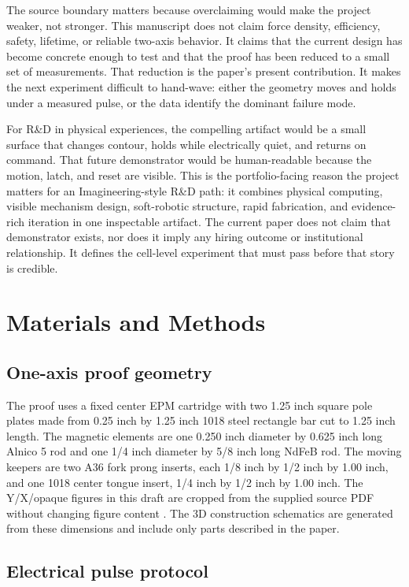 \documentclass[12pt,letterpaper]{article}
\begin{document}
The source boundary matters because overclaiming would make the project weaker, not stronger. This manuscript does not claim force density, efficiency, safety, lifetime, or reliable two-axis behavior. It claims that the current design has become concrete enough to test and that the proof has been reduced to a small set of measurements. That reduction is the paper's present contribution. It makes the next experiment difficult to hand-wave: either the geometry moves and holds under a measured pulse, or the data identify the dominant failure mode.

For R\&D in physical experiences, the compelling artifact would be a small surface that changes contour, holds while electrically quiet, and returns on command. That future demonstrator would be human-readable because the motion, latch, and reset are visible. This is the portfolio-facing reason the project matters for an Imagineering-style R\&D path: it combines physical computing, visible mechanism design, soft-robotic structure, rapid fabrication, and evidence-rich iteration in one inspectable artifact. The current paper does not claim that demonstrator exists, nor does it imply any hiring outcome or institutional relationship. It defines the cell-level experiment that must pass before that story is credible.

\section{Materials and Methods}

\subsection{One-axis proof geometry}

The proof uses a fixed center EPM cartridge with two 1.25 inch square pole plates made from 0.25 inch by 1.25 inch 1018 steel rectangle bar cut to 1.25 inch length. The magnetic elements are one 0.250 inch diameter by 0.625 inch long Alnico 5 rod and one 1/4 inch diameter by 5/8 inch long NdFeB rod. The moving keepers are two A36 fork prong inserts, each 1/8 inch by 1/2 inch by 1.00 inch, and one 1018 center tongue insert, 1/4 inch by 1/2 inch by 1.00 inch. The Y/X/opaque figures in this draft are cropped from the supplied source PDF without changing figure content \cite{fluxcellGeometry2026}. The 3D construction schematics are generated from these dimensions and include only parts described in the paper.

\subsection{Electrical pulse protocol}
\end{document}

